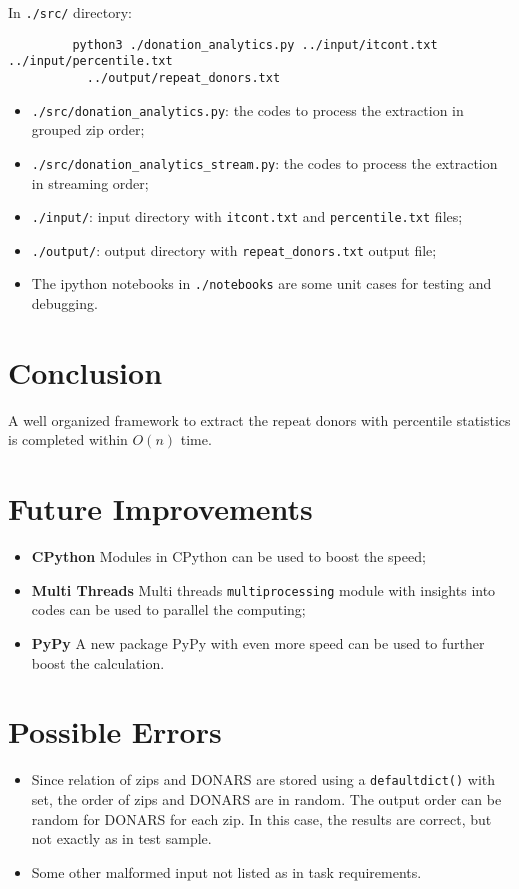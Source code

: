 \documentclass[twoside]{article}
\begin{document}
\hspace{4ex} In \verb|./src/| directory:

\begin{verbatim}
         python3 ./donation_analytics.py ../input/itcont.txt ../input/percentile.txt 
           ../output/repeat_donors.txt
\end{verbatim}

\begin{itemize}
\item \verb|./src/donation_analytics.py|: the codes to process the extraction in grouped zip order;
\item \verb|./src/donation_analytics_stream.py|: the codes to process the extraction in streaming order;
\item \verb|./input/|: input directory with \verb|itcont.txt| and \verb|percentile.txt| files;
\item \verb|./output/|: output directory with \verb|repeat_donors.txt| output file; 
\item The ipython notebooks in \verb|./notebooks| are some unit cases for testing and debugging.  
\end{itemize}
 
  
 \section{Conclusion}
 
 A well organized framework to extract the repeat donors with percentile statistics is completed within $O(n)$ time. 

  \section{Future Improvements}
 \begin{itemize}
 \item \textbf{CPython} Modules in CPython can be used to boost the speed;
 
 \item \textbf{Multi Threads} Multi threads \verb|multiprocessing| module with insights into codes can be used to parallel the computing; 
 
 \item \textbf{PyPy} A new package PyPy with even more speed can be used to further boost the calculation.
 \end{itemize}
 
  \section{Possible Errors}
 \begin{itemize}
 \item Since relation of zips and DONARS are stored using a \verb|defaultdict()| with set, the order of zips and DONARS are in random. The output order can be random for DONARS for each zip. In this case, the results are correct, but not exactly as in test sample. 
 \item Some other malformed input not listed as in task requirements. 
 \end{itemize}
\end{document}
